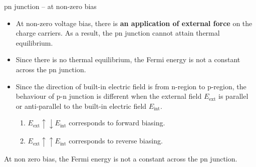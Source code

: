 \begin{frame}[label=pre-M2T1-slot2]{pn junction -- at non-zero bias}
	\begin{itemize}
		\item At non-zero voltage bias, there is \textbf{an application of external force} on the charge carriers. As a result, the pn junction cannot attain thermal equilibrium.
		\item Since there is no thermal equilibrium, the Fermi energy is not a constant across the pn junction.
		\item Since the direction of built-in electric field is from n-region to p-region, the behaviour of p-n junction is different when the external field \(E_\text{ext}\) is parallel or anti-parallel to the built-in electric field \(E_\text{int}\).
		\begin{enumerate}
			\item \(E_\text{ext} \uparrow \downarrow E_\text{int}\) corresponds to forward biasing.
			\item \(E_\text{ext} \uparrow \uparrow E_\text{int}\) corresponds to reverse biasing.
		\end{enumerate}
	\end{itemize}
	\begin{keyinsight}
		At non zero bias, the Fermi energy is not a constant across the pn junction.
	\end{keyinsight}
\end{frame}
%
